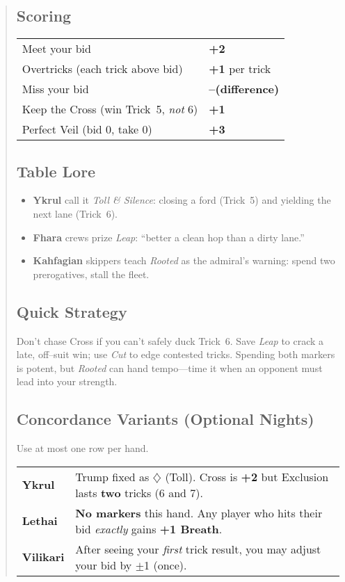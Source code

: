 \documentclass[11pt]{article}
\begin{document}
\begin{quote}
\subsection*{Scoring}
\noindent\begin{tabularx}{\linewidth}{@{}l >{\raggedleft\arraybackslash}X@{}}
\toprule
Meet your bid & \textbf{+2} \\
Overtricks (each trick above bid) & \textbf{+1} per trick \\
Miss your bid & \textbf{–(difference)} \\
Keep the Cross (win Trick~5, \emph{not} 6) & \textbf{+1} \\
Perfect Veil (bid 0, take 0) & \textbf{+3} \\
\bottomrule
\end{tabularx}

\subsection*{Table Lore}
\begin{itemize}[leftmargin=1.2em,itemsep=0.25em]
  \item \textbf{Ykrul} call it \emph{Toll \& Silence}: closing a ford (Trick~5) and yielding the next lane (Trick~6).
  \item \textbf{Fhara} crews prize \emph{Leap}: “better a clean hop than a dirty lane.”
  \item \textbf{Kahfagian} skippers teach \emph{Rooted} as the admiral’s warning: spend two prerogatives, stall the fleet.
\end{itemize}

\subsection*{Quick Strategy}
Don’t chase Cross if you can’t safely duck Trick~6. Save \emph{Leap} to crack a late,
off–suit win; use \emph{Cut} to edge contested tricks. Spending both markers is potent,
but \emph{Rooted} can hand tempo—time it when an opponent must lead into your strength.

\subsection*{Concordance Variants (Optional Nights)}
Use at most one row per hand.
\medskip

\noindent\begin{tabularx}{\linewidth}{@{}>{\bfseries}l X@{}}
\toprule
Ykrul & Trump fixed as $\diamondsuit$ (Toll). Cross is \textbf{+2} but Exclusion lasts \textbf{two} tricks (6 and 7).\\
Lethai & \textbf{No markers} this hand. Any player who hits their bid \emph{exactly} gains \textbf{+1 Breath}.\\
Vilikari & After seeing your \emph{first} trick result, you may adjust your bid by $\pm$1 (once).\\
\bottomrule
\end{tabularx}


\end{quote}
\end{document}
